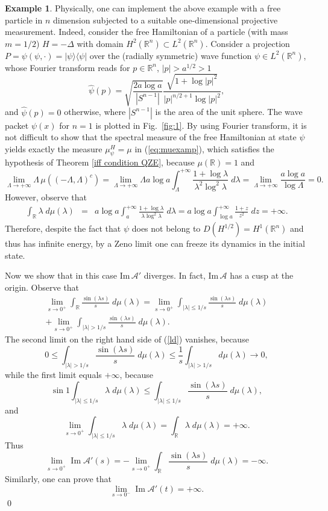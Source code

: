 \documentclass[aip,jmp,12pt
]{revtex4}
\renewcommand{\Im}{\mathop{\mathrm{Im}}\nolimits}
\newcommand{\RM}{\mathbb{R}}
\theoremstyle{definition}
\newtheorem{example}{Example}
\begin{document}
\begin{example}
Physically, one can implement the above example with a free particle in $n$ dimension subjected to a suitable one-dimensional projective measurement. Indeed, consider the free Hamiltonian  of a particle (with mass $m=1/2$)  $H=-\Delta$ with domain $H^2(\mathbb{R}^n)\subset L^2(\mathbb{R}^n)$.  Consider a projection $P=\psi(\psi,\cdot)=|\psi\rangle \langle\psi|$ over the (radially symmetric) wave function  $\psi\in L^2(\mathbb{R}^n)$, whose Fourier transform reads for $p\in \mathbb{R}^n$, $|p|>a^{1/2}>1$
\[
\hat{\psi}(p)=\sqrt{\frac{2 a\log a }{|S^{n-1}|}}\frac{\sqrt{1+\log |p|^2}}{|p|^{n/2+1} \log |p|^2},
\]
and $\hat{\psi}(p)=0$ otherwise,
where $|S^{n-1}|$ is the area of the unit sphere. The wave packet $\psi(x)$ for $n=1$ is plotted in Fig.\ \ref{fig:1}.
By using Fourier transform, it is not difficult to show that the spectral measure of the free Hamiltonian at state $\psi$ yields exactly the measure $\mu_\psi^H=\mu$ in (\ref{eq:muexamp}), which satisfies the hypothesis of Theorem \ref{iff
condition QZE}, because $\mu(\RM)=1$ and
\[
\lim_{\Lambda \to +\infty} \Lambda\, \mu((-\Lambda, \Lambda)^c)= \lim_{\Lambda \to +\infty} \Lambda a \log a \int_{\Lambda}^{+\infty} \frac{1+\log \lambda}{\lambda^2 \log^2 \lambda} \; d\lambda= \lim_{\Lambda \to +\infty} \frac{a\log a}{\log \Lambda}=0.
\]
However, observe that
\begin{eqnarray*}
\int_{\RM} \lambda \; d\mu(\lambda) & = & a\log a\int_{a}^{+\infty} \frac{1+\log \lambda}{\lambda \log^2 \lambda} \; d\lambda =
                                     a\log a\int_{\log a}^{+\infty} \frac{1+z}{z^2} \; dz 
                                                                       =  + \infty.
\end{eqnarray*}
Therefore, despite the fact that $\psi$ does not belong to $D(H^{1/2})=H^1(\mathbb{R}^n)$ and thus has infinite energy, by a Zeno limit one can freeze its dynamics in the initial state.



Now we show that in this case Im$\,\mathcal{A}'$ diverges. In fact, Im$\,\mathcal{A}$ has a cusp at the origin. Observe that
\begin{multline}\label{ld}
\lim_{s \to 0^+}\int_{\RM}  \frac{\sin(\lambda s)}{s}\; d\mu(\lambda)  = \lim_{s \to 0^+}\int_{|\lambda|\leq 1/s}  \frac{\sin(\lambda s)}{s}\; d\mu(\lambda) \\ +\lim_{s \to 0^+} \int_{|\lambda| > 1/s}  \frac{\sin(\lambda s)}{s}\; d\mu(\lambda).
\end{multline}
The second limit on the right hand side of (\ref{ld}) vanishes, because
\[
0 \leq \int_{|\lambda| > 1/s}  \frac{\sin(\lambda s)}{s}\; d\mu(\lambda) \leq \frac{1}{s}\int_{|\lambda| > 1/s} d\mu(\lambda) \to 0 ,
\]
while the first limit equals  $+\infty$, because
\[
\sin 1 \int_{|\lambda|\leq 1/s} \lambda \; d\mu(\lambda) \leq \int_{|\lambda|\leq 1/s} \frac{\sin(\lambda s)}{s}\; d\mu(\lambda),
\]
and
\[
\lim_{s \to 0^+} \int_{|\lambda|\leq 1/s} \lambda \; d\mu(\lambda) = \int_{\RM} \lambda\; d\mu(\lambda)=+\infty.
\]
Thus
\[
\lim_{s \to 0^+} \Im \mathcal{A}'(s)=-\lim_{s \to 0^+}\int_{\RM}  \frac{\sin(\lambda s)}{s}\; d\mu(\lambda)  = -\infty.
\]
Similarly, one can prove that
\[
\lim_{s \to 0^-} \Im \mathcal{A}'(t)= + \infty.
\]
\qed
\end{example}
\end{document}
